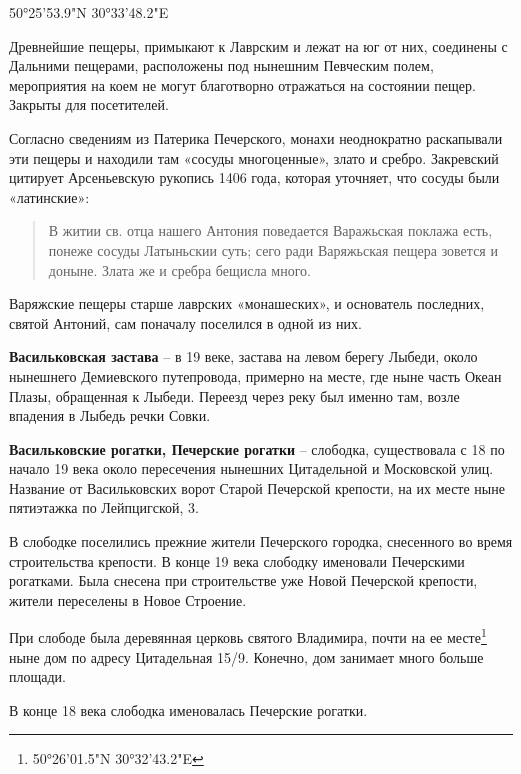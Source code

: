 50°25'53.9"N 30°33'48.2"E

Древнейшие пещеры, примыкают к Лаврским и лежат на юг от них, соединены с Дальними пещерами, расположены под нынешним Певческим полем, мероприятия на коем не могут благотворно отражаться на состоянии пещер. Закрыты для посетителей.

Согласно сведениям из Патерика Печерского, монахи неоднократно раскапывали эти пещеры и находили там «сосуды многоценные», злато и сребро. Закревский цитирует Арсеньевскую рукопись 1406 года, которая уточняет, что сосуды были «латинские»:

\begin{quotation}
В житии св. отца нашего Антония поведается Варажьская поклажа есть, понеже сосуды Латыньскии суть; сего ради Варяжьская пещера зовется и доныне. Злата же и сребра бещисла много.
\end{quotation}

Варяжские пещеры старше лаврских «монашеских», и основатель последних, святой Антоний, сам поначалу поселился в одной из них.\\

\medskip

\textbf{Васильковская застава} – в 19 веке, застава на левом берегу Лыбеди, около нынешнего Демиевского путепровода, примерно на месте, где ныне часть Океан Плазы, обращенная к Лыбеди. Переезд через реку был именно там, возле впадения в Лыбедь речки Совки.\\

\medskip

\textbf{Васильковские рогатки, Печерские рогатки} – слободка, существовала с 18 по начало 19 века около пересечения нынешних Цитадельной и Московской улиц. Название от Васильковских ворот Старой Печерской крепости, на их месте ныне пятиэтажка по Лейпцигской, 3. 

В слободке поселились прежние жители Печерского городка, снесенного во время строительства крепости. В конце 19 века слободку именовали Печерскими рогатками. Была снесена при строительстве уже Новой Печерской крепости, жители переселены в Новое Строение.

При слободе была деревянная церковь святого Владимира, почти на ее месте\footnote{50°26'01.5"N 30°32'43.2"E} ныне дом по адресу Цитадельная 15/9. Конечно, дом занимает много больше площади.

В конце 18 века слободка именовалась Печерские рогатки.\\

\medskip

